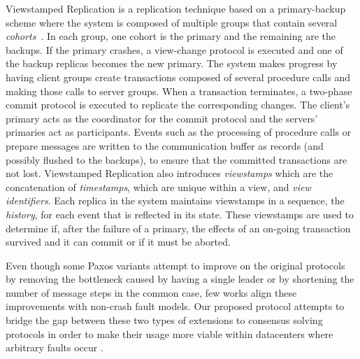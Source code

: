 Viewstamped Replication is a replication technique based on a primary-backup scheme where the system is composed of multiple groups that contain several \textit{cohorts}~\cite{Oki:1988}. In each group, one cohort is the primary and the remaining are the backups. If the primary crashes, a view-change protocol is executed and one of the backup replicas becomes the new primary. The system makes progress by having client groups create transactions composed of several procedure calls and making those calls to server groups. When a transaction terminates, a two-phase commit protocol is executed to replicate the corresponding changes. The client's primary acts as the coordinator for the commit protocol and the servers' primaries act as participants. Events such as the processing of procedure calls or prepare messages are written to the communication buffer as records (and possibly flushed to the backups), to ensure that the committed transactions are not lost. Viewstamped Replication also introduces \textit{viewstamps} which are the concatenation of \textit{timestamps}, which are unique within a view, and \textit{view identifiers}. Each replica in the system maintains viewstamps in a sequence, the \textit{history}, for each event that is reflected in its state. These viewstamps are used to determine if, after the failure of a primary, the effects of an on-going transaction survived and it can commit or if it must be aborted. \par
Even though some Paxos variants attempt to improve on the original protocols by removing the bottleneck caused by having a single leader or by shortening the number of message steps in the common case, few works align these improvements with non-crash fault models. Our proposed protocol attempts to bridge the gap between these two types of extensions to consensus solving protocols in order to make their usage more viable within datacenters where arbitrary faults occur .

